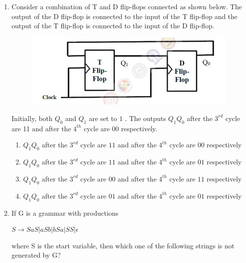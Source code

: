 \documentclass[a4paper, 11pt]{article}
\begin{document}
\begin{enumerate}
    \hfill{}

    \item Consider a combination of T and D flip-flops connected as shown below. The output of the D flip-flop is connected to the input of the T flip-flop and the output of the T flip-flop is connected to the input of the D flip-flop.
    
    \begin{figure}[h]
        \includegraphics[width=\columnwidth]{figs/q33.png}
        \label{fig:placeholder}
    \end{figure}
    
    Initially, both $Q_{0}$ and $Q_{1}$ are set to $1$ . The outputs $Q_{1}Q_{0}$ after the $3^{rd}$ cycle are 11 and after the $4^{th}$ cycle are 00 respectively.
    \begin{enumerate}
        \item $Q_{1}Q_{0}$ after the $3^{rd}$ cycle are $11$ and after the $4^{th}$ cycle are $00$ respectively
        \item $Q_{1}Q_{0}$ after the $3^{rd}$ cycle are $11$ and after the $4^{th}$ cycle are $01$ respectively
        \item $Q_{1}Q_{0}$ after the $3^{rd}$ cycle are $00$ and after the $4^{th}$ cycle are $11$ respectively
        \item $Q_{1}Q_{0}$ after the $3^{rd}$ cycle are $01$ and after the $4^{th}$ cycle are $01$ respectively
    \end{enumerate}
    
    \hfill{}

    \item If G is a grammar with productions
    \begin{center}
        $S\to SaS|aSb|bSa|SS|\epsilon$
    \end{center}
    where S is the start variable, then which one of the following strings is not generated by G?
    \begin{enumerate}
    \end{enumerate}
    

\end{enumerate}
\end{document}

